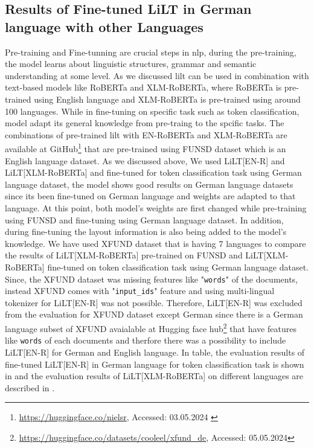 \subsection{Results of Fine-tuned LiLT in German language with other Languages}
Pre-training and Fine-tunning are crucial steps in \acrshort{nlp}, during the pre-training, the model learns about linguistic structures, grammar and semantic understanding at some level. As we discussed \acrshort{lilt} can be used in combination with text-based models like RoBERTa and XLM-RoBERTa, where RoBERTa is pre-trained using English language and XLM-RoBERTa is pre-trained using around 100 languages. While in fine-tuning on specific task such as token classification, model adapt its general knowledge from pre-traing to the spcific tasks. The combinations of pre-trained \acrshort{lilt} with EN-RoBERTa and XLM-RoBERTa are available at GitHub\footnote{\url{https://huggingface.co/nielsr}, Accessed: 03.05.2024 \label{base_models}} that are pre-trained using FUNSD dataset which is an English language dataset. As we discussed above, We used LiLT[EN-R] and LiLT[XLM-RoBERTa] and fine-tuned for token classification task using German language dataset, the model shows good results on German language datasets since its been fine-tuned on German language and weights are adapted to that language. At this point, both model's weights are first changed while pre-training using FUNSD and fine-tuning using German language dataset. In addition, during fine-tuning the layout information is also being added to the model's knowledge. We have used XFUND dataset that is having 7 languages to compare the results of LiLT[XLM-RoBERTa] pre-trained on FUNSD and LiLT[XLM-RoBERTa] fine-tuned on token classification task using German language dataset. Since, the XFUND dataset was missing features like "\verb|words|" of the documents, instead XFUND comes with "\verb|input_ids|" feature and using multi-lingual tokenizer for LiLT[EN-R] was not possible. Therefore, LiLT[EN-R] was excluded from the evaluation for XFUND dataset except German since there is a German language subset of XFUND avaialable at Hugging face hub\footnote{\url{https://huggingface.co/datasets/cooleel/xfund_de}, Accessed: 05.05.2024} that have features like \verb|words| of each documents and therfore there was a possibility to include LiLT[EN-R] for German and English language. In table, the evaluation results of fine-tuned LiLT[EN-R] in German language for token classification task is shown in  and the evaluation results of LiLT[XLM-RoBERTa] on different languages are described in . 


